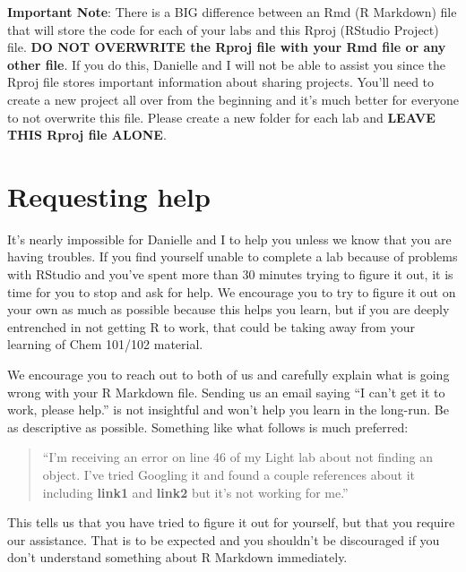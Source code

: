 \documentclass[]{tufte-book}
\begin{document}
\textbf{Important Note}: There is a BIG difference between an Rmd (R
Markdown) file that will store the code for each of your labs and this
Rproj (RStudio Project) file. \textbf{DO NOT OVERWRITE the Rproj file
with your Rmd file or any other file}. If you do this, Danielle and I
will not be able to assist you since the Rproj file stores important
information about sharing projects. You'll need to create a new project
all over from the beginning and it's much better for everyone to not
overwrite this file. Please create a new folder for each lab and
\textbf{LEAVE THIS Rproj file ALONE}.

\section*{Requesting help}\label{requesting-help}

It's nearly impossible for Danielle and I to help you unless we know
that you are having troubles. If you find yourself unable to complete a
lab because of problems with RStudio and you've spent more than 30
minutes trying to figure it out, it is time for you to stop and ask for
help. We encourage you to try to figure it out on your own as much as
possible because this helps you learn, but if you are deeply entrenched
in not getting R to work, that could be taking away from your learning
of Chem 101/102 material.

We encourage you to reach out to both of us and carefully explain what
is going wrong with your R Markdown file. Sending us an email saying ``I
can't get it to work, please help.'' is not insightful and won't help
you learn in the long-run. Be as descriptive as possible. Something like
what follows is much preferred:

\vspace{0.1in}

\begin{quote}
``I'm receiving an error on line 46 of my Light lab about not finding an
object. I've tried Googling it and found a couple references about it
including \textbf{link1} and \textbf{link2} but it's not working for
me.''
\end{quote}

\vspace{0.1in}

This tells us that you have tried to figure it out for yourself, but
that you require our assistance. That is to be expected and you
shouldn't be discouraged if you don't understand something about R
Markdown immediately.
\end{document}
